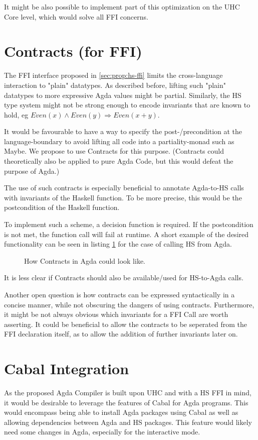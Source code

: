 \documentclass[12pt, a4paper, twoside]{report}
\begin{document}
It might be also possible to implement part of this optimization on the UHC Core level, which would solve all
FFI concerns.

\section{Contracts (for FFI)}
\label{sec:contracts}
The FFI interface proposed in \ref{sec:prop:hs-ffi} limits the cross-language interaction
to "plain" datatypes. As described before, lifting such "plain" datatypes to more expressive
Agda values might be partial. Similarly, the HS type system might not be strong enough
to encode invariants that are known to hold, eg $Even(x) \land Even(y) \Rightarrow Even(x + y)$.

It would be favourable to have a way to specify the post-/precondition at the language-boundary
to avoid lifting all code into a partiality-monad such as Maybe.
We propose to use Contracts for this purpose. (Contracts could
theoretically also be applied to pure Agda Code, but this would defeat the purpose of Agda.)

The use of such contracts is especially beneficial to annotate Agda-to-HS calls with invariants
of the Haskell function. To be more precise, this would be the postcondition of the Haskell function.

To implement such a scheme, a decision function is required. If the postcondition is not met,
the function call will fail at runtime. A short example of the desired functionality can be seen in listing \ref{lst:agda-con-ex}
for the case of calling HS from Agda.


\begin{figure}

\caption{How Contracts in Agda could look like.}
\label{lst:agda-con-ex}
\end{figure}

It is less clear if Contracts should also be available/used for HS-to-Agda calls.

Another open question is how
contracts can be expressed syntactically in a concise manner, while not obscuring the dangers of using contracts.
Furthermore, it might be not always obvious which invariants for a FFI Call are worth asserting. It could be beneficial
to allow the contracts to be seperated from the FFI declaration itself, as to allow the addition of further invariants later on.


\section{Cabal Integration}
As the proposed Agda Compiler is built upon UHC and with a HS FFI in mind, it would be desirable
to leverage the features of Cabal for Agda programs. This would encompass being able
to install Agda packages using Cabal as well as allowing dependencies between Agda and HS packages.
This feature would likely need some changes in Agda, especially
for the interactive mode.
\end{document}
